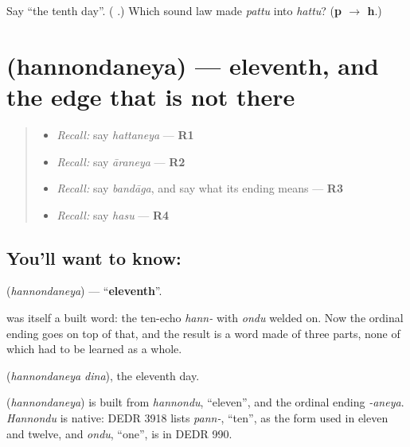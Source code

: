 \begin{tcolorbox}[breakable,colback=teal!4,colframe=teal!35!black,title={Before you move on}]
Say \textquotedblleft{}the tenth day\textquotedblright{}. (\textbf{ }.) Which sound law made \emph{pattu} into \emph{hattu}? (\textbf{p $\to$ h}.)
\end{tcolorbox}
\section[\texorpdfstring{\kn{ಹನ್ನೊಂದನೆಯ} (hannondaneya)}{ಹನ್ನೊಂದನೆಯ (hannondaneya)}]{ (hannondaneya) — eleventh, and the edge that is not there}

\label{lesson:KA-C75-eleventh}



\begin{quote}
\begin{itemize}
\raggedright
  \item \emph{Recall:} say \emph{hattaneya} — \textbf{R1}
  \item \emph{Recall:} say \emph{āraneya} — \textbf{R2}
  \item \emph{Recall:} say \emph{bandāga}, and say what its ending means — \textbf{R3}
  \item \emph{Recall:} say \emph{hasu} — \textbf{R4}
\end{itemize}
\end{quote}

\subsection*{You'll want to know: }
\textbf{} (\emph{hannondaneya}) — \textquotedblleft{}\textbf{eleventh}\textquotedblright{}.

\textbf{} was itself a built word: the ten-echo \emph{hann-} with \emph{ondu} welded on. Now the ordinal ending goes on top of that, and the result is a word made of three parts, none of which had to be learned as a whole.

\textbf{ } (\emph{hannondaneya dina}), the eleventh day.

\begin{cousinweb}
\textbf{} (\emph{hannondaneya}) is built from \emph{hannondu}, \textquotedblleft{}eleven\textquotedblright{}, and the ordinal ending \emph{-aneya}. \emph{Hannondu} is native: DEDR 3918 lists \emph{pann-}, \textquotedblleft{}ten\textquotedblright{}, as the form used in eleven and twelve, and \emph{ondu}, \textquotedblleft{}one\textquotedblright{}, is in DEDR 990.
\end{cousinweb}

